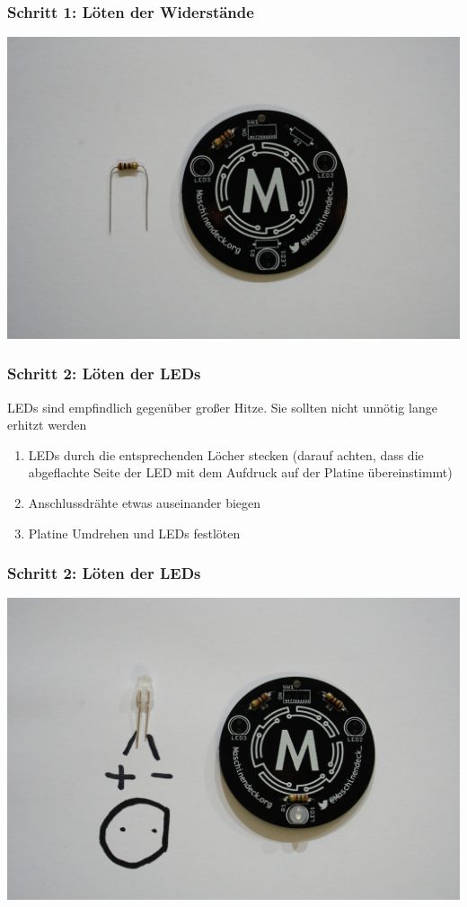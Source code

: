 \documentclass[10pt]{beamer}
\begin{document}
	\begin{frame}
		\frametitle{Schritt 1: Löten der Widerstände}
		\includegraphics[width=\linewidth]{images/badge18/resistor.JPG}
	\end{frame}
	
	\begin{frame}
	\frametitle{Schritt 2: Löten der LEDs}
	LEDs sind empfindlich gegenüber großer Hitze. Sie sollten nicht unnötig lange erhitzt werden
	\begin{enumerate} 
		\item{LEDs durch die entsprechenden Löcher stecken (darauf achten, dass die abgeflachte Seite der LED mit dem Aufdruck auf der Platine übereinstimmt)}
		\item{Anschlussdrähte etwas auseinander biegen}
		\item{Platine Umdrehen und LEDs festlöten}
	\end{enumerate}
	\end{frame}

	\begin{frame}
		\frametitle{Schritt 2: Löten der LEDs}
		\includegraphics[width=\linewidth]{images/badge18/ledPolarity.JPG}
	\end{frame}
\end{document}
